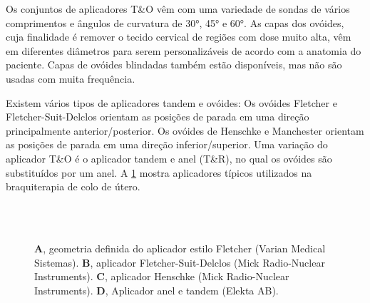 \documentclass[11pt,a4paper]{article}
\begin{document}
	Os conjuntos de aplicadores T\&O vêm com uma variedade de sondas de vários comprimentos e ângulos de curvatura de \ang{30}, \ang{45} e \ang{60}. As capas dos ovóides, cuja finalidade é remover o tecido cervical de regiões com dose muito alta, vêm em diferentes diâmetros para serem personalizáveis de acordo com a anatomia do paciente. Capas de ovóides blindadas também estão disponíveis, mas não são usadas com muita frequência. 
	
	Existem vários tipos de aplicadores tandem e ovóides: Os ovóides Fletcher e Fletcher-Suit-Delclos orientam as posições de parada em uma direção principalmente anterior/posterior. Os ovóides de Henschke e Manchester orientam as posições de parada em uma direção inferior/superior. Uma variação do aplicador T\&O é o aplicador tandem e anel (T\&R), no qual os ovóides são substituídos por um anel. A \ref{fig:aplicadoresCervix} mostra aplicadores típicos utilizados na braquiterapia de colo de útero.

	\begin{figure}[h]
		\centering
		 \\ %
		 \\ %
		\caption{\textbf{A}, geometria definida do aplicador estilo Fletcher (Varian Medical
		Sistemas). \textbf{B}, aplicador Fletcher-Suit-Delclos (Mick Radio-Nuclear Instruments). \textbf{C}, aplicador Henschke (Mick Radio-Nuclear Instruments). \textbf{D}, Aplicador anel e tandem (Elekta AB).}
		\label{fig:aplicadoresCervix}
	\end{figure}
\end{document}
